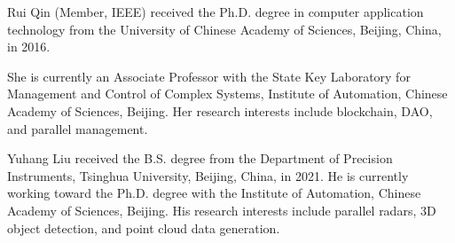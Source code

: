 \documentclass[lettersize,journal]{IEEEtran}
\begin{document}
\vspace{-33pt}

\begin{IEEEbiography}{Rui Qin}
  (Member, IEEE) received the Ph.D. degree in computer application technology from the University of Chinese Academy of Sciences, Beijing, China, in 2016.

  She is currently an Associate Professor with the State Key Laboratory for Management and Control of Complex Systems, Institute of Automation, Chinese Academy of Sciences, Beijing. Her research interests include blockchain, DAO, and parallel management.
\end{IEEEbiography}

\vspace{-33pt}

\begin{IEEEbiography}{Yuhang Liu}
  received the B.S. degree from the Department of Precision Instruments, Tsinghua University, Beijing, China, in 2021. He is currently working toward the Ph.D. degree with the Institute of Automation, Chinese Academy of Sciences, Beijing. His research interests include parallel radars, 3D object detection, and point cloud data generation.
\end{IEEEbiography}

\vspace{-33pt}
\end{document}
